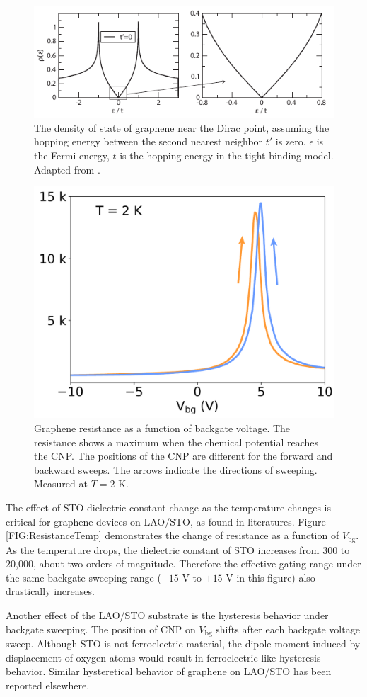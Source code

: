 \documentclass[pdflatex, sectionletters, 12pt]{pittetd}    %
\begin{document}
\begin{figure}[h!]
	\centering
	\includegraphics[width=.9\textwidth]{Drawing/DOS.pdf}
	\caption{The density of state of graphene near the Dirac point, assuming the hopping energy between the second nearest neighbor $t'$ is zero. $\epsilon$ is the Fermi energy, $t$ is the hopping energy in the tight binding model. Adapted from \cite{neto2009electronic}.}
	\label{FIG:DOS}
\end{figure}

\begin{figure}[h!]
	\centering
	\includegraphics[width=.5\textwidth]{Drawing/DiracPeak.pdf}
	\caption{Graphene resistance as a function of backgate voltage. The resistance shows a maximum when the chemical potential reaches the CNP. The positions of the CNP are different for the forward and backward sweeps. The arrows indicate the directions of sweeping. Measured at $T = 2$ K.}
	\label{FIG:DiracPeak}
\end{figure}

The effect of STO dielectric constant change as the temperature changes is critical for graphene devices on LAO/STO, as found in literatures\cite{couto2011transport}. Figure \ref{FIG:ResistanceTemp} demonstrates the change of resistance as a function of $V_\mathrm{bg}$. As the temperature drops, the dielectric constant of STO increases from 300 to 20,000, about two orders of magnitude. Therefore the effective gating range under the same backgate sweeping range ($-15$ V to $+15$ V in this figure) also drastically increases. 

Another effect of the LAO/STO substrate is the hysteresis behavior under backgate sweeping. The position of CNP on $V_\mathrm{bg}$ shifts after each backgate voltage sweep. Although STO is not ferroelectric material, the dipole moment induced by displacement of oxygen atoms would result in ferroelectric-like hysteresis behavior\cite{sachs2014ferroelectric}. Similar hysteretical behavior of graphene on LAO/STO has been reported elsewhere\cite{jnawali2017room}. 
\\
\end{document}
